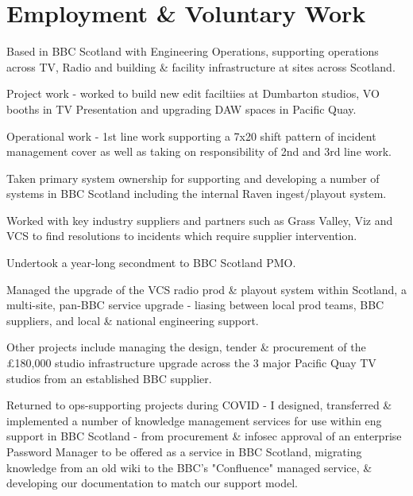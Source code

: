 \documentclass[]{deedy-resume-openfont}
\begin{document}
\hfill
\begin{minipage}[t]{0.66\textwidth} 


\section{Employment \& Voluntary Work}

\vspace{\topsep} %
\begin{tightemize}
\item Based in BBC Scotland with Engineering Operations, supporting operations across TV, Radio and building \& facility infrastructure at sites across Scotland.
\item Project work - worked to build new edit faciltiies at Dumbarton studios, VO booths in TV Presentation and upgrading DAW spaces in Pacific Quay.
\item Operational work - 1st line work supporting a 7x20 shift pattern of incident management cover as well as taking on responsibility of 2nd and 3rd line work.
\item Taken primary system ownership for supporting and developing a number of systems in BBC Scotland including the internal Raven ingest/playout system.
\item Worked with key industry suppliers and partners such as Grass Valley, Viz and VCS to find resolutions to incidents which require supplier intervention. 
\end{tightemize}
\sectionsep

\begin{tightemize}
\item Undertook a year-long secondment to BBC Scotland PMO.
\item Managed the upgrade of the VCS radio prod \& playout system within Scotland, a multi-site, pan-BBC service upgrade - liasing between local prod teams, BBC suppliers, and local \& national engineering support.
\item Other projects include managing the design, tender \& procurement of the £180,000 studio infrastructure upgrade across the 3 major Pacific Quay TV studios from an established BBC supplier.
\item Returned to ops-supporting projects during COVID - I designed, transferred \& implemented a number of knowledge management services for use within eng support in BBC Scotland - from procurement \& infosec approval of an enterprise Password Manager to be offered as a service in BBC Scotland, migrating knowledge from an old wiki to the BBC's "Confluence" managed service, \& developing our documentation to match our support model.
\end{tightemize}
\sectionsep


\end{minipage}
\end{document}
